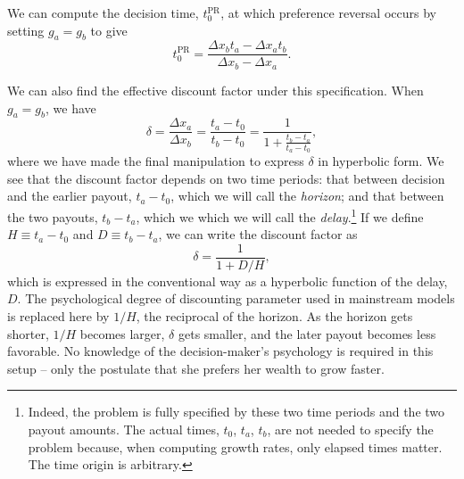 \documentclass[11pt]{article}
\newcommand{\elabel}[1]{\label{eq:#1}}
\newcommand{\eref}[1]{Eq.~(\ref{eq:#1})}
\newcommand{\flabel}[1]{\label{fig:#1}}
\newcommand{\be}{\begin{equation}}
\newcommand{\ee}{\end{equation}}
\newcommand{\Dt}{\Delta t}
\newcommand{\Dx}{\Delta x}
\newcommand{\del}{D}
\newcommand{\hor}{H}
\numberwithin{equation}{section}
\begin{document}


We can compute the decision time, $t_0^\text{PR}$, at which preference reversal occurs by setting $g_a=g_b$ to give
\be
t_0^\text{PR} = \frac{\Dx_b t_a - \Dx_a t_b}{\Dx_b - \Dx_a}.
\elabel{t0PR}
\ee

We can also find the effective discount factor under this specification. When $g_a=g_b$, we have
\be
\delta = \frac{\Dx_a}{\Dx_b} = \frac{t_a-t_0}{t_b-t_0} = \frac{1}{1+\frac{t_b-t_a}{t_a-t_0}},
\ee
where we have made the final manipulation to express $\delta$ in hyperbolic form. We see that the discount factor depends on two time periods: that between decision and the earlier payout, $t_a-t_0$, which we will call the \textit{horizon}; and that between the two payouts, $t_b-t_a$, which we which we will call the \textit{delay}.\footnote{Indeed, the problem is fully specified by these two time periods and the two payout amounts. The actual times, $t_0$, $t_a$, $t_b$, are not needed to specify the problem because, when computing growth rates, only elapsed times matter. The time origin is arbitrary.} If we define $\hor\equiv t_a-t_0$ and $\del\equiv t_b-t_a$, we can write the discount factor as
\be
\delta = \frac{1}{1+\del/\hor},
\ee
which is expressed in the conventional way as a hyperbolic function of the delay, $\del$. The psychological degree of discounting parameter used in mainstream models is replaced here by $1/\hor$, the reciprocal of the horizon. As the horizon gets shorter, $1/\hor$ becomes larger, $\delta$ gets smaller, and the later payout becomes less favorable. No knowledge of the decision-maker's psychology is required in this setup -- only the postulate that she prefers her wealth to grow faster.
\end{document}
